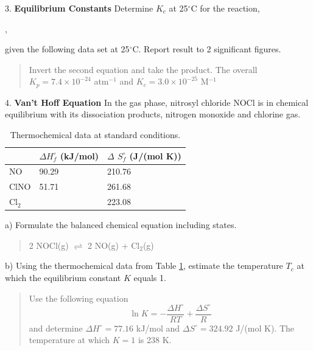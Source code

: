 \documentclass[11pt]{article}
\newcommand{\brian}[1]{
  {\begin{quote}
      \color{blue} #1
  \end{quote}}
}
\begin{document}
3. \textbf{Equilibrium Constants} Determine $K_c$ at 25$^\circ$C
for the reaction,
\begin{center}
  ,
\end{center}
given the following data set at 25$^\circ$C. Report result to 2 significant figures.
\begin{center}


\end{center}

\brian{Invert the second equation and take the product. The overall $K_p = 7.4\times 10^{-24}$ atm$^{-1}$
  and $K_c = 3.0 \times 10^{-25}$ M$^{-1}$
  }

4. \textbf{Van't Hoff Equation} In the gas phase, nitrosyl chloride NOCl is in chemical
equilibrium with its dissociation products, nitrogen monoxide and chlorine gas.

\begin{table}[hbpt]
  \centering
  \begin{tabular}{lll}
      & $\Delta H^\circ_f$ (kJ/mol) & {\color{blue}$\Delta$} $S^\circ_f$ (J/(mol K)) \\
      \hline
      NO     & 90.29 & 210.76 \\
      ClNO   & 51.71 & 261.68 \\
      Cl$_2$ &       & 223.08
  \end{tabular}
  \caption{Thermochemical data at standard conditions.}
  \label{tab:therm}
\end{table}

a) Formulate the balanced chemical equation including states.

\brian{2 NOCl(g) $\rightleftharpoons$ 2 NO(g) + Cl$_2$(g)}

b) Using the thermochemical data from Table \ref{tab:therm}, estimate the temperature $T_c$
at which the equilibrium constant $K$ equals 1.

\brian{Use the following equation
  \begin{equation*}
      \ln K = -\frac{\Delta H^\circ}{RT} + \frac{\Delta S^\circ}{R}
  \end{equation*}
  and determine $\Delta H^\circ = 77.16$ kJ/mol and $\Delta S^\circ=324.92$ J/(mol K). The
  temperature at which $K=1$ is 238 K.
}
\end{document}
